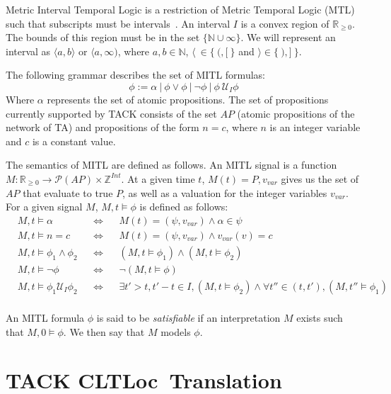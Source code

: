 \documentclass[a4paper,11pt]{report}
\theoremstyle{definition}
\newcommand{\cltloc}{CLTLoc}
\begin{document}
Metric Interval Temporal Logic is a restriction of Metric Temporal Logic (MTL)
such that subscripts must be intervals~\cite{bouyer09}. An interval $I$ is a
convex region of $\mathbb{R}_{\geq 0}$. The bounds of this region must be in the
set $\{\mathbb{N} \cup \infty\}$. We will represent an interval as
$\langle a,b \rangle$ or $\langle a,\infty )$, where $a,b \in \mathbb{N}$,
$\langle\ \in \{\ (,[\ \}$ and $\rangle \in \{\ ),]\ \}$.

The following grammar describes the set of MITL formulas:
\[\phi := \alpha\ |\ \phi \lor \phi\ |\ \neg \phi\ |\ \phi\ \mathcal{U}_{I} \phi\]
Where $\alpha$ represents the set of atomic propositions. The set of
propositions currently supported by TACK consists of the set $AP$ (atomic
propositions of the network of TA) and propositions of the form $n = c$, where
$n$ is an integer variable and $c$ is a constant value.

The semantics of MITL are defined as follows. An MITL signal is a function
$M : \mathbb{R}_{\geq 0} \rightarrow \mathcal{P}(AP) \times \mathbb{Z}^{Int}$.
At a given time $t$, $M(t) = P, v_{var}$ gives us the set of $AP$ that evaluate
to true $P$, as well as a valuation for the integer variables $v_{var}$. For a
given signal $M$, $M,t \vDash \phi$ is defined as follows:
\begin{align*}
  &M,t \vDash \alpha && \Leftrightarrow && M(t) = (\psi,v_{var}) \land \alpha \in \psi \\
  &M,t \vDash n = c && \Leftrightarrow && M(t) = (\psi,v_{var}) \land v_{var}(v) = c \\
  &M,t \vDash \phi_{1} \land \phi_{2} && \Leftrightarrow && (M,t \vDash \phi_{1}) \land (M,t \vDash \phi_{2}) \\
  &M,t \vDash \neg \phi && \Leftrightarrow && \neg (M,t \vDash \phi) \\
  &M,t \vDash \phi_{1} \mathcal{U}_{I} \phi_{2} && \Leftrightarrow && \exists t' > t, t' - t \in I, (M,t \vDash \phi_{2}) \land \forall t'' \in (t,t'), (M,t'' \vDash \phi_{1}) \\
\end{align*}

An MITL formula $\phi$ is said to be \emph{satisfiable} if an interpretation
$M$ exists such that $M,0 \vDash \phi$. We then say that $M$ models $\phi$.


\section{TACK \cltloc\ Translation}\label{prelim-tack}
\end{document}
